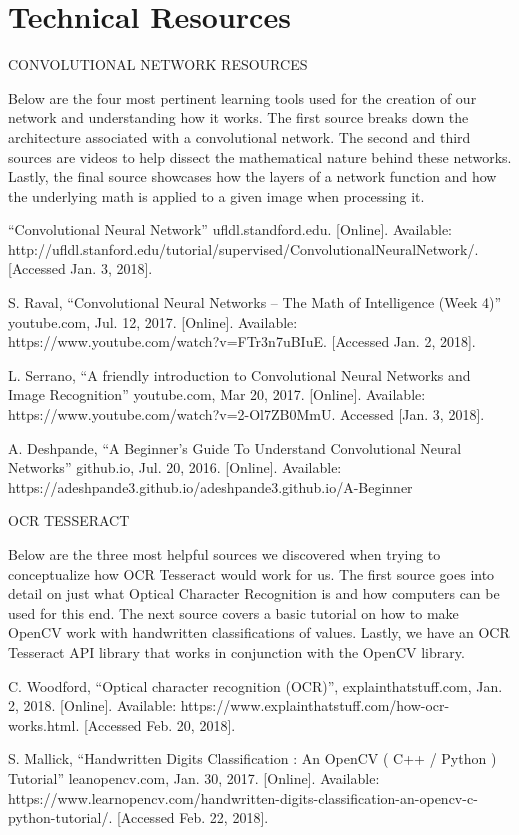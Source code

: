\documentclass[article, onecolumn, draftclsnofoot,10pt, compsoc]{IEEEtran}
\begin{document}
\section{Technical Resources}
CONVOLUTIONAL NETWORK RESOURCES

Below are the four most pertinent learning tools used for the creation of our network and understanding how it works. The first source breaks down the architecture associated with a convolutional network. The second and third sources are videos to help dissect the mathematical nature behind these networks. Lastly, the final source showcases how the layers of a network function and how the underlying math is applied to a given image when processing it.

“Convolutional Neural Network” ufldl.standford.edu. [Online]. Available: http://ufldl.stanford.edu/tutorial/supervised/ConvolutionalNeuralNetwork/. [Accessed Jan. 3, 2018].

S. Raval, “Convolutional Neural Networks – The Math of Intelligence (Week 4)” youtube.com, Jul. 12, 2017. [Online]. Available: https://www.youtube.com/watch?v=FTr3n7uBIuE. [Accessed Jan. 2, 2018].

L. Serrano, “A friendly introduction to Convolutional Neural Networks and Image Recognition” youtube.com, Mar 20, 2017. [Online]. Available: https://www.youtube.com/watch?v=2-Ol7ZB0MmU. Accessed [Jan. 3, 2018].

A. Deshpande, “A Beginner’s Guide To Understand Convolutional Neural Networks” github.io, Jul. 20, 2016. [Online]. Available: https://adeshpande3.github.io/adeshpande3.github.io/A-Beginner%

OCR TESSERACT

Below are the three most helpful sources we discovered when trying to conceptualize how OCR Tesseract would work for us. The first source goes into detail on just what Optical Character Recognition is and how computers can be used for this end. The next source covers a basic tutorial on how to make OpenCV work with handwritten classifications of values. Lastly, we have an OCR Tesseract API library that works in conjunction with the OpenCV library. 

C. Woodford, “Optical character recognition (OCR)”, explainthatstuff.com, Jan. 2, 2018. [Online]. Available: https://www.explainthatstuff.com/how-ocr-works.html. [Accessed Feb. 20, 2018].

S. Mallick, “Handwritten Digits Classification : An OpenCV ( C++ / Python ) Tutorial” leanopencv.com, Jan. 30, 2017. [Online]. Available: https://www.learnopencv.com/handwritten-digits-classification-an-opencv-c-python-tutorial/. [Accessed Feb. 22, 2018].
\end{document}
